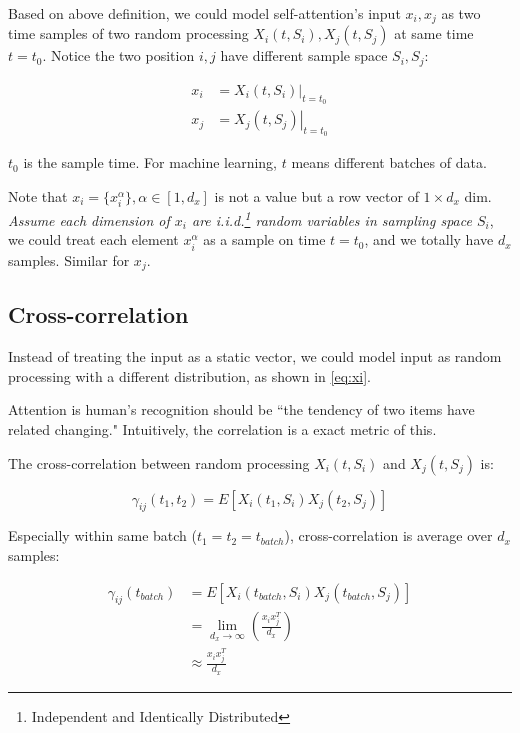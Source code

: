 \documentclass[final]{cvpr}
\begin{document}
Based on above definition, we could model self-attention's input $x_i, x_j$ as two time samples of two random processing $X_i(t, S_{i}), X_j(t, S_{j})$ at same time $t=t_0$. Notice the two position $i,j$ have different sample space $S_i, S_j$:

\begin{align}
    x_i &= \left. X_i(t, S_i)\right\vert_{t=t_0}\label{eq:xi}\\
    x_j &= \left. X_j(t, S_j)\right\vert_{t=t_0}
\end{align}

$t_0$ is the sample time. For machine learning, $t$ means different batches of data.

Note that $x_i=\{x_i^{\alpha}\},\alpha\in[1,d_x]$ is not a value but a row vector of $1\times d_x$ dim. \textit{Assume each dimension of $x_i$ are i.i.d.\footnote{Independent and Identically Distributed} random variables in sampling space $S_i$}, we could treat each element $x_i^{\alpha}$ as a sample on time $t=t_0$, and we totally have $d_x$ samples. Similar for $x_j$.

\subsection{Cross-correlation}
\label{sec:cc}

Instead of treating the input as a static vector, we could model input as random processing with a different distribution, as shown in \autoref{eq:xi}.

Attention is human's recognition should be ``the tendency of two items have related changing." Intuitively, the correlation is a exact metric of this. 

The cross-correlation between random processing $X_i(t, S_i)$ and $X_j(t, S_j)$ is:

\begin{equation}
    \gamma_{ij}(t_1,t_2)=E[X_i(t_1, S_i)X_j(t_2, S_j)]
\end{equation}

Especially within same batch ($t_1=t_2=t_{batch}$), cross-correlation is average over $d_x$ samples:

\begin{align}
    \gamma_{ij}(t_{batch})&=E[X_i(t_{batch}, S_i)X_j(t_{batch}, S_j)] \\
                          &=\lim_{d_x\to\infty}\left(\frac{x_ix_j^T}{d_x}\right)\label{eq:true-cc}\\
                          &\approx\frac{x_ix_j^T}{d_x}\label{eq:sim-cc}
\end{align}
\end{document}
